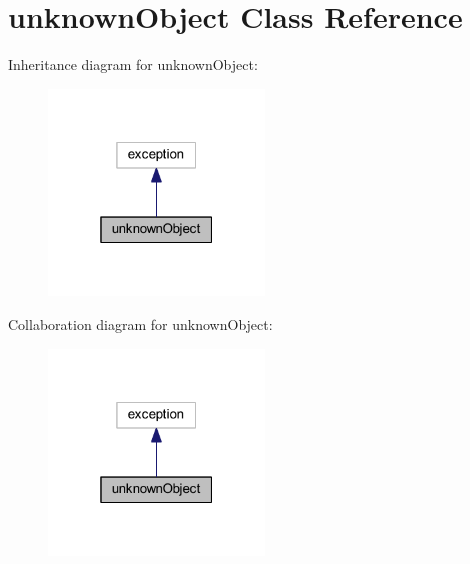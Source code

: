 \hypertarget{classunknown_object}{\section{unknown\+Object Class Reference}
\label{classunknown_object}
}


Inheritance diagram for unknown\+Object\+:\nopagebreak
\begin{figure}[H]
\begin{center}
\leavevmode
\includegraphics[width=163pt]{classunknown_object__inherit__graph}
\end{center}
\end{figure}


Collaboration diagram for unknown\+Object\+:\nopagebreak
\begin{figure}[H]
\begin{center}
\leavevmode
\includegraphics[width=163pt]{classunknown_object__coll__graph}
\end{center}
\end{figure}
